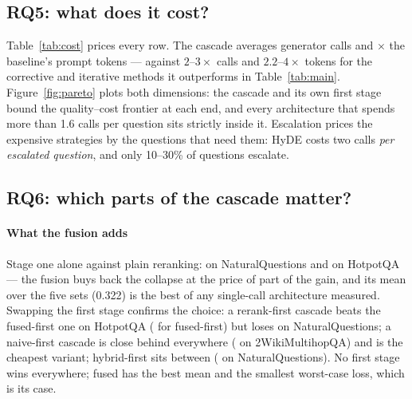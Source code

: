\subsection{RQ5: what does it cost?}
\label{sec:results-cost}

\begin{widetable}[t]
\caption{Cost per question, averaged over the sets each architecture ran
on, from the per-question logs. The last column is prompt tokens relative
to the naive baseline. The cross-encoder pass (rerank, fused, cascade) and
the CPU lexical search (BM25, hybrid, fused, cascade) are outside the
token count.}
\label{tab:cost}
\fitwidth{\CostTable}
\end{widetable}

Table~\ref{tab:cost} prices every row. The cascade averages
\CostcascadeCalls{} generator calls and \CostcascadePromptRatio$\times$ the
baseline's prompt tokens --- against $2$--$3\times$ calls and
$2.2$--$4\times$ tokens for the corrective and iterative methods it
outperforms in Table~\ref{tab:main}. Figure~\ref{fig:pareto} plots both
dimensions: the cascade and its own first stage bound the quality--cost
frontier at each end, and every architecture that spends more than 1.6
calls per question sits strictly inside it. Escalation prices the
expensive strategies by the questions that need them: HyDE costs two
calls \emph{per escalated question}, and only 10--30\% of questions
escalate.

\subsection{RQ6: which parts of the cascade matter?}
\label{sec:results-ablations}

\paragraph{What the fusion adds} Stage one alone against plain reranking:
\RerankVsFusedNQExactMatchDiff{} on NaturalQuestions and
\RerankVsFusedHotpotQAExactMatchDiff{} on HotpotQA --- the fusion buys
back the collapse at the price of part of the gain, and its mean over the
five sets (0.322) is the best of any single-call architecture measured.
Swapping the first stage confirms the choice: a rerank-first cascade beats
the fused-first one on HotpotQA
(\CascadeRerankVsCascadeHotpotQAExactMatchDiff{} for fused-first) but
loses \CascadeRerankVsCascadeNQExactMatchDiff{} on NaturalQuestions; a
naive-first cascade is close behind everywhere
(\CascadeNaiveVsCascadeTwoWikiExactMatchDiff{} on 2WikiMultihopQA) and is
the cheapest variant; hybrid-first sits between
(\CascadeHybridVsCascadeNQExactMatchDiff{} on NaturalQuestions). No first
stage wins everywhere; fused has the best mean and the smallest
worst-case loss, which is its case.

